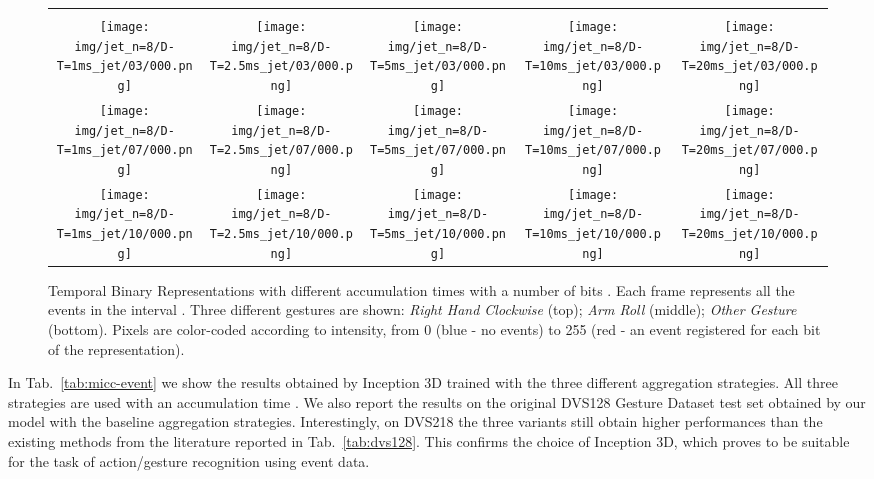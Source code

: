 \documentclass[a4paper,conference]{IEEEtran}
\begin{document}
\begin{figure*}[t]
	\centering
	\begin{tabular}{ccccc}
		 &  &  &  &  \\
		\texttt{[image: img/jet\_n=8/D-T=1ms\_jet/03/000.png]} &
		\texttt{[image: img/jet\_n=8/D-T=2.5ms\_jet/03/000.png]} &
		\texttt{[image: img/jet\_n=8/D-T=5ms\_jet/03/000.png]} &
		\texttt{[image: img/jet\_n=8/D-T=10ms\_jet/03/000.png]} &
		\texttt{[image: img/jet\_n=8/D-T=20ms\_jet/03/000.png]} \\
		
		\texttt{[image: img/jet\_n=8/D-T=1ms\_jet/07/000.png]} &
		\texttt{[image: img/jet\_n=8/D-T=2.5ms\_jet/07/000.png]} &
		\texttt{[image: img/jet\_n=8/D-T=5ms\_jet/07/000.png]} &
		\texttt{[image: img/jet\_n=8/D-T=10ms\_jet/07/000.png]} &
		\texttt{[image: img/jet\_n=8/D-T=20ms\_jet/07/000.png]} \\
		
		\texttt{[image: img/jet\_n=8/D-T=1ms\_jet/10/000.png]} &
		\texttt{[image: img/jet\_n=8/D-T=2.5ms\_jet/10/000.png]} &
		\texttt{[image: img/jet\_n=8/D-T=5ms\_jet/10/000.png]} &
		\texttt{[image: img/jet\_n=8/D-T=10ms\_jet/10/000.png]} &
		\texttt{[image: img/jet\_n=8/D-T=20ms\_jet/10/000.png]} \\
	\end{tabular}
	\caption{Temporal Binary Representations with different accumulation times  with a number of bits . Each frame represents all the events in the interval . Three different gestures are shown: \textit{Right Hand Clockwise} (top); \textit{Arm Roll} (middle); \textit{Other Gesture} (bottom). Pixels are color-coded according to intensity, from 0 (blue - no events) to 255 (red - an event registered for each bit of the representation).}
	\label{fig:deltat_fig}
\end{figure*}

In Tab.~\ref{tab:micc-event} we show the results obtained by Inception 3D trained with the three different aggregation strategies. All three strategies are used with an accumulation time . We also report the results on the original DVS128 Gesture Dataset test set obtained by our model with the baseline aggregation strategies. Interestingly, on DVS218 the three variants still obtain higher performances than the existing methods from the literature reported in Tab.~\ref{tab:dvs128}. This confirms the choice of Inception 3D, which proves to be suitable for the task of action/gesture recognition using event data.
\end{document}
